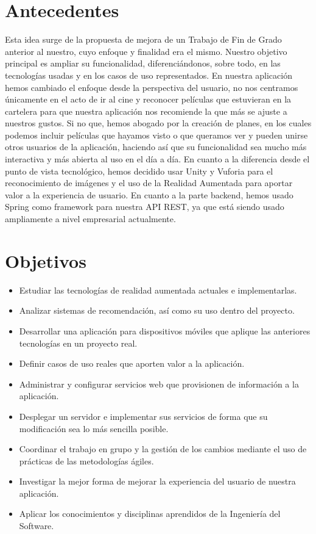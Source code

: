 \section{Antecedentes}
\label{makereference1.1}
\begin{flushleft}
    Esta idea surge de la propuesta de mejora de un Trabajo de Fin de Grado anterior
    al nuestro, cuyo enfoque y finalidad era el mismo. Nuestro objetivo principal es 
    ampliar su funcionalidad, diferenciándonos, sobre todo, en las tecnologías usadas y 
    en los casos de uso representados.
    En nuestra aplicación hemos cambiado el enfoque desde la perspectiva del usuario, no 
    nos centramos únicamente en el acto de ir al cine y reconocer películas que estuvieran en la cartelera
    para que nuestra aplicación nos recomiende la que más se ajuste a nuestros gustos. Si no que, hemos 
    abogado por la creación de planes, en los cuales podemos incluir películas que hayamos visto o que queramos ver
    y pueden unirse otros usuarios de la aplicación, haciendo así que su funcionalidad sea mucho más interactiva y más
    abierta al uso en el día a día.
    En cuanto a la diferencia desde el punto de vista tecnológico, hemos decidido usar Unity y Vuforia para el reconocimiento
    de imágenes y el uso de la Realidad Aumentada para aportar valor a la experiencia de usuario. En cuanto a la parte backend, 
    hemos usado Spring como framework para nuestra API REST, ya que está siendo usado ampliamente a nivel empresarial actualmente.
\end{flushleft}
\newpage
\section{Objetivos}
\label{makereference1.2}
\begin{itemize}  
    \item Estudiar las tecnologías de realidad aumentada actuales e implementarlas.
    \item Analizar sistemas de recomendación, así como su uso dentro del proyecto.
    \item Desarrollar una aplicación para dispositivos móviles que aplique las anteriores tecnologías en un proyecto real.
    \item Definir casos de uso reales que aporten valor a la aplicación.
    \item Administrar y configurar servicios web que provisionen de información a la aplicación.
    \item Desplegar un servidor e implementar sus servicios de forma que su modificación sea lo más sencilla posible.
    \item Coordinar el trabajo en grupo y la gestión de los cambios mediante el uso de prácticas de las metodologías ágiles.
    \item Investigar la mejor forma de mejorar la experiencia del usuario de nuestra aplicación.
    \item Aplicar los conocimientos y disciplinas aprendidos de la Ingeniería del Software.
\end{itemize}

